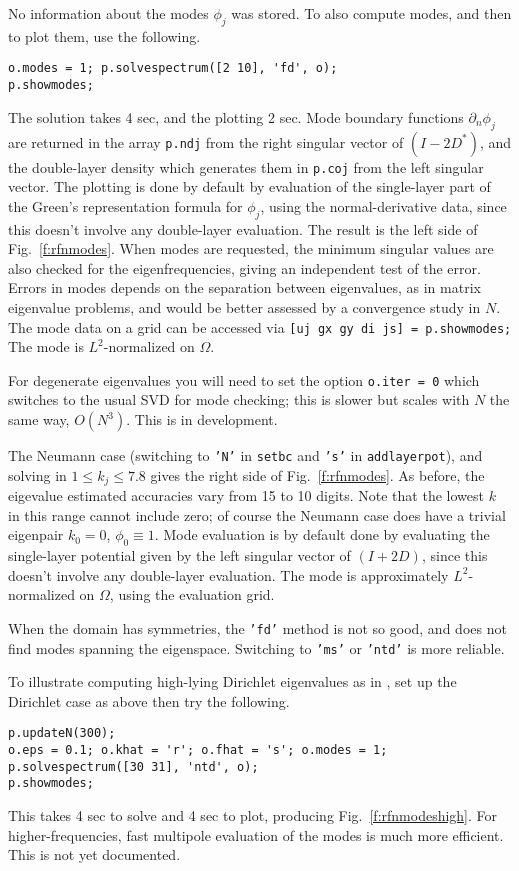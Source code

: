 No information about the modes $\phi_j$ was stored.
To also compute modes, and then to plot them, use the following.
\begin{verbatim}
o.modes = 1; p.solvespectrum([2 10], 'fd', o);
p.showmodes;
\end{verbatim}
The solution takes 4 sec, and the plotting 2 sec.
Mode boundary functions $\partial_n\phi_j$ are returned in the array
{\tt p.ndj} from the right singular vector of $(I-2D^\ast)$,
and the double-layer density which generates them in {\tt p.coj}
from the left singular vector.
The plotting is done by default
by evaluation of the single-layer part of the
Green's representation formula for $\phi_j$, using the
normal-derivative data, since this doesn't involve any double-layer evaluation.
The result is the left side of Fig.~\ref{f:rfnmodes}.
When modes are requested, the minimum singular values are also
checked for the eigenfrequencies, giving an independent test of the error.
Errors in modes depends on the separation between eigenvalues,
as in matrix eigenvalue problems, and would be better assessed by a convergence
study in $N$.
The mode data on a grid can be accessed via
{\tt [uj gx gy di js] = p.showmodes;}
The mode is $L^2$-normalized on $\Omega$.


For degenerate eigenvalues you will need to set the option
{\tt o.iter = 0} which switches to the usual SVD for mode checking;
this is slower but scales with $N$ the same way, $O(N^3)$.
This is in development.

The Neumann case (switching to {\tt 'N'} in {\tt setbc} and {\tt 's'} in
{\tt addlayerpot}), and solving in $1\le k_j \le 7.8$
gives the right side of Fig.~\ref{f:rfnmodes}.
As before, the eigevalue estimated accuracies vary from 15 to 10 digits.
Note that the lowest $k$ in this range cannot include zero;
of course the Neumann case does have a trivial eigenpair
$k_0=0$, $\phi_0 \equiv 1$.
Mode evaluation is by default done by evaluating the single-layer potential
given by the left singular vector of $(I+2D)$,
since this doesn't involve any double-layer evaluation.
The mode is approximately $L^2$-normalized on $\Omega$, using the
evaluation grid.


When the domain has symmetries, the {\tt 'fd'} method is not so good,
and does not find modes spanning the eigenspace.
Switching to {\tt 'ms'} or {\tt 'ntd'} is more reliable.


To illustrate computing high-lying Dirichlet eigenvalues as in \cite{sca},
set up the Dirichlet case as above then try the following.
\begin{verbatim}
p.updateN(300);
o.eps = 0.1; o.khat = 'r'; o.fhat = 's'; o.modes = 1;
p.solvespectrum([30 31], 'ntd', o);
p.showmodes;
\end{verbatim}
This takes 4 sec to solve and 4 sec to plot, producing
Fig.~\ref{f:rfnmodeshigh}.
For higher-frequencies, fast multipole evaluation of the modes is
much more efficient. This is not yet documented.

